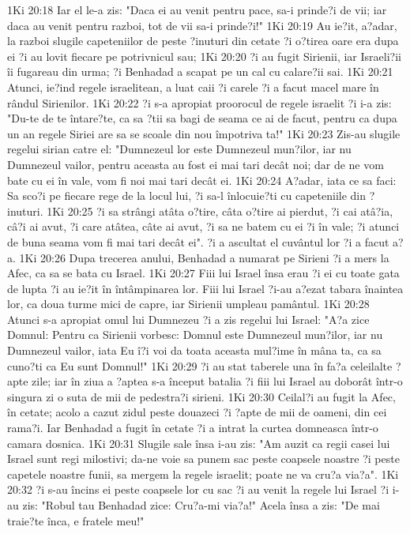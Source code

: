 1Ki 20:18  Iar el le-a zis: "Daca ei au venit pentru pace, sa-i prinde?i de vii; iar daca au venit pentru razboi, tot de vii sa-i prinde?i!"
1Ki 20:19  Au ie?it, a?adar, la razboi slugile capeteniilor de peste ?inuturi din cetate ?i o?tirea oare era dupa ei ?i au lovit fiecare pe potrivnicul sau;
1Ki 20:20  ?i au fugit Sirienii, iar Israeli?ii îi fugareau din urma; ?i Benhadad a scapat pe un cal cu calare?ii sai.
1Ki 20:21  Atunci, ie?ind regele israelitean, a luat caii ?i carele ?i a facut macel mare în rândul Sirienilor.
1Ki 20:22  ?i s-a apropiat proorocul de regele israelit ?i i-a zis: "Du-te de te întare?te, ca sa ?tii sa bagi de seama ce ai de facut, pentru ca dupa un an regele Siriei are sa se scoale din nou împotriva ta!"
1Ki 20:23  Zis-au slugile regelui sirian catre el: "Dumnezeul lor este Dumnezeul mun?ilor, iar nu Dumnezeul vailor, pentru aceasta au fost ei mai tari decât noi; dar de ne vom bate cu ei în vale, vom fi noi mai tari decât ei.
1Ki 20:24  A?adar, iata ce sa faci: Sa sco?i pe fiecare rege de la locul lui, ?i sa-l înlocuie?ti cu capeteniile din ?inuturi.
1Ki 20:25  ?i sa strângi atâta o?tire, câta o?tire ai pierdut, ?i cai atâ?ia, câ?i ai avut, ?i care atâtea, câte ai avut, ?i sa ne batem cu ei ?i în vale; ?i atunci de buna seama vom fi mai tari decât ei". ?i a ascultat el cuvântul lor ?i a facut a?a.
1Ki 20:26  Dupa trecerea anului, Benhadad a numarat pe Sirieni ?i a mers la Afec, ca sa se bata cu Israel.
1Ki 20:27  Fiii lui Israel însa erau ?i ei cu toate gata de lupta ?i au ie?it în întâmpinarea lor. Fiii lui Israel ?i-au a?ezat tabara înaintea lor, ca doua turme mici de capre, iar Sirienii umpleau pamântul.
1Ki 20:28  Atunci s-a apropiat omul lui Dumnezeu ?i a zis regelui lui Israel: "A?a zice Domnul: Pentru ca Sirienii vorbesc: Domnul este Dumnezeul mun?ilor, iar nu Dumnezeul vailor, iata Eu î?i voi da toata aceasta mul?ime în mâna ta, ca sa cuno?ti ca Eu sunt Domnul!"
1Ki 20:29  ?i au stat taberele una în fa?a celeilalte ?apte zile; iar în ziua a ?aptea s-a început batalia ?i fiii lui Israel au doborât într-o singura zi o suta de mii de pedestra?i sirieni.
1Ki 20:30  Ceilal?i au fugit la Afec, în cetate; acolo a cazut zidul peste douazeci ?i ?apte de mii de oameni, din cei rama?i. Iar Benhadad a fugit în cetate ?i a intrat la curtea domneasca într-o camara dosnica.
1Ki 20:31  Slugile sale însa i-au zis: "Am auzit ca regii casei lui Israel sunt regi milostivi; da-ne voie sa punem sac peste coapsele noastre ?i peste capetele noastre funii, sa mergem la regele israelit; poate ne va cru?a via?a".
1Ki 20:32  ?i s-au încins ei peste coapsele lor cu sac ?i au venit la regele lui Israel ?i i-au zis: "Robul tau Benhadad zice: Cru?a-mi via?a!" Acela însa a zis: "De mai traie?te înca, e fratele meu!"
